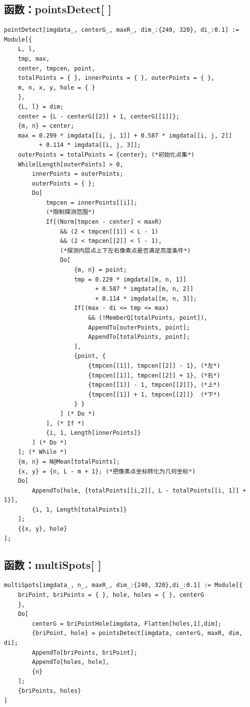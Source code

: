 \documentclass[UTF8,a4paper,12pt]{article}
\begin{document}
\subsection{函数：pointsDetect[ ]}
\begin{verbatim}
pointDetect[imgdata_, centerG_, maxR_, dim_:{240, 320}, di_:0.1] := Module[{
    L, l,
    tmp, max,
    center, tmpcen, point,
    totalPoints = { }, innerPoints = { }, outerPoints = { },
    m, n, x, y, hole = { }
    },
    {L, l} = dim;
    center = {L - centerG[[2]] + 1, centerG[[1]]};
    {m, n} = center;
    max = 0.299 * imgdata[[i, j, 1]] + 0.587 * imgdata[[i, j, 2]] 
          + 0.114 * imgdata[[i, j, 3]];
    outerPoints = totalPoints = {center}; (*初始化点集*)
    While[Length[outerPoints] > 0,
        innerPoints = outerPoints;
        outerPoints = { };
        Do[
            tmpcen = innerPoints[[i]];
            (*限制探测范围*)
            If[(Norm[tmpcen - center] < maxR) 
                && (2 < tmpcen[[1]] < L - 1) 
                && (2 < tmpcen[[2]] < l - 1),
                (*探测内层点上下左右像素点是否满足亮度条件*)
                Do[
                    {m, n} = point;
                    tmp = 0.229 * imgdata[[m, n, 1]] 
                          + 0.587 * imgdata[[m, n, 2]]
                          + 0.114 * imgdata[[m, n, 3]];
                    If[(max - di <= tmp <= max) 
                        && (!MemberQ[totalPoints, point]),
                        AppendTo[outerPoints, point]; 
                        AppendTo[totalPoints, point];
                    ],
                    {point, {
                        {tmpcen[[1]], tmpcen[[2]] - 1}, (*左*)
                        {tmpcen[[1]], tmpcen[[2]] + 1}, (*右*)
                        {tmpcen[[1]] - 1, tmpcen[[2]]}, (*上*)
                        {tmpcen[[1]] + 1, tmpcen[[2]]}  (*下*)
                    } }
                ] (* Do *)
            ], (* If *)
            {i, 1, Length[innerPoints]}
        ] (* Do *)
    ]; (* While *)
    {m, n} = N@Mean[totalPoints];
    {x, y} = {n, L - m + 1}; (*把像素点坐标转化为几何坐标*)
    Do[
        AppendTo[hole, {totalPoints[[i,2]], L - totalPoints[[i, 1]] + 1}],
        {i, 1, Length[totalPoints]}
    ];
    {{x, y}, hole}
];
\end{verbatim}

\subsection{函数：multiSpots[ ]}
\begin{verbatim}
multiSpots[imgdata_, n_, maxR_, dim_:{240, 320},di_:0.1] := Module[{
    briPoint, briPoints = { }, hole, holes = { }, centerG
    },
    Do[
        centerG = briPointHole[imgdata, Flatten[holes,1],dim];
        {briPoint, hole} = pointsDetect[imgdata, centerG, maxR, dim, di];
        AppendTo[briPoints, briPoint];
        AppendTo[holes, hole],
        {n}
    ];
    {briPoints, holes}
]
\end{verbatim}
\end{document}
